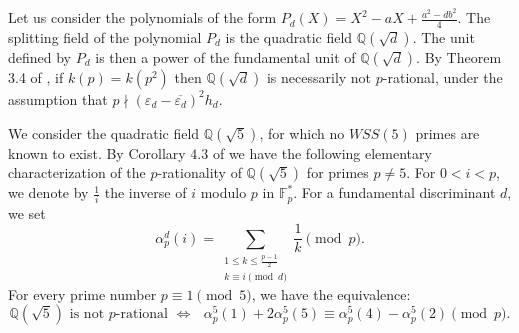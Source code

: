\documentclass[12pt,reqno]{amsart}
\newcommand{\F}{\mathbb{F}}
\newcommand{\Z}{\mathbb{Z}}
\begin{document}
Let us consider the polynomials of the form $P_{d}(X)=X^2-aX+\frac{a^2-db^2}{4}$. The splitting field
of the polynomial $P_d$ is the quadratic field $\mathbb{Q}(\sqrt{d})$. The unit defined by $P_d$ is then a power of the fundamental
unit of $\mathbb{Q}(\sqrt{d})$. By Theorem 3.4 of \cite{B2}, if $k(p)= k(p^2)$ then $\mathbb{Q}(\sqrt{d})$ is necessarily not $p$-rational, under the assumption that $p\nmid(\varepsilon_d-\overline{\varepsilon_d})^{2}h_d$.
\vspace{1em}

We consider the quadratic field $\mathbb{Q}(\sqrt{5})$, for which no $WSS(5)$ primes are known to exist.
By Corollary $4.3$ of \cite{B2} we have the following elementary characterization of the $p$-rationality of
$\mathbb{Q}(\sqrt{5})$ for primes $p\neq5$. For $0<i<p$, we denote by $\frac{1}{i}$ the inverse
of $i$ modulo $p$ in $\mathbb{F}_{p}^*$. For a fundamental discriminant $d$, we set
\begin{equation*}
\alpha_{p}^{d}(i)=\sum_{\begin{array}{c}
	1\leq k\leq \frac{p-1}{2}\\
	k\equiv i\pmod{d}
	\end{array}
}\frac{1}{k}\pmod{p}.
\end{equation*}
For every prime number $p\equiv1\pmod{5}$, we have the equivalence:
\begin{equation*}
\text{$\mathbb{Q}(\sqrt{5})$ is not $p$-rational $\iff$ $\alpha_p^5(1)+2\alpha_p^5(5)\equiv\alpha_p^5(4)-\alpha_p^5(2)\pmod{p}$.}
\end{equation*}









\end{document}
